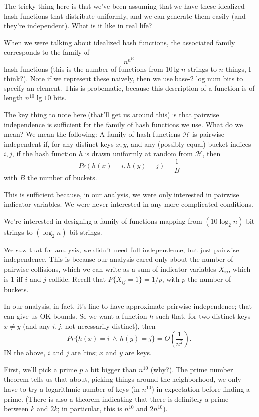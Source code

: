 \documentclass{article}
\begin{document}
The tricky thing here is that we've been assuming that we have these
idealized hash functions that distribute uniformly, and we can generate
them easily (and they're independent).
What is it like in real life?


When we were talking about idealized hash functions, the associated
family corresponds to the family of
$$
n^{n^{10}}
$$
hash functions (this is the number of functions from $10\lg n$ strings to
$n$ things, I think?).
Note if we represent these naively, then we use base-2 log num bits to
specify an element.
This is probematic, because this description of a function is of 
length $n^{10}\lg 10$ bits.

The key thing to note here (that'll get us around this) is that pairwise 
independence is sufficient
for the family of hash functions we use.
What do we mean?
We mean the following:
A family of hash functions $\mathcal H$ is pairwise independent if,
for any distinct keys $x,y$, and any (possibly equal) bucket
indices $i,j$, if the hash function $h$ is drawn uniformly at random
from $\mathcal H$,
then
$$
Pr(h(x) = i, h(y) = j)
=
\frac{1}{B}
$$
with $B$ the number of buckets.

This is sufficient because, in our analysis, we were only interested in
pairwise indicator variables. 
We were never interested in any more complicated conditions.



We're interested in designing a family of functions mapping from
$(10 \log_2 n)$-bit strings to $(\log_2 n)$-bit strings.

We saw that for analysis, we didn't need full independence, but just
pairwise independence.
This is because our analysis cared only about the number of pairwise collisions,
which we can write as a sum of indicator variables $X_{ij}$, which is
1 iff $i$ and $j$ collide.
Recall that $P\{X_{ij} = 1\} = 1/p$, with $p$ the number of buckets.

In our analysis, in fact, it's fine to have approximate pairwise independence;
that can give us OK bounds.
So we want a function $h$ such that, for two distinct keys $x\neq y$ (and any $i,j$, not necessarily distinct),
then
$$
Pr\{
	h(x) = i \,\wedge\,
	h(y) = j
\}
=
O\left(
	\frac{1}{n^2}
\right).
$$
IN the above, $i$ and $j$ are bins; $x$ and $y$ are keys.

First, we'll pick a prime $p$ a bit bigger than $n^{10}$ (why?).
The prime number theorem tells us that about, picking things around the
neighborhood, we only have to try a logarithmic number of keys (in $n^{10}$)
in expectation before finding a prime.
(There is also a theorem indicating that there is definitely a prime
between $k$ and $2k$; in particular, this is $n^{10}$ and $2n^{10}$).
\end{document}

